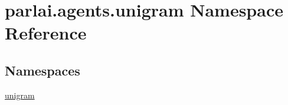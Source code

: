 \hypertarget{namespaceparlai_1_1agents_1_1unigram}{}\section{parlai.\+agents.\+unigram Namespace Reference}
\label{namespaceparlai_1_1agents_1_1unigram}
\subsection*{Namespaces}
\begin{DoxyCompactItemize}
\item 
 \hyperlink{namespaceparlai_1_1agents_1_1unigram_1_1unigram}{unigram}
\end{DoxyCompactItemize}
